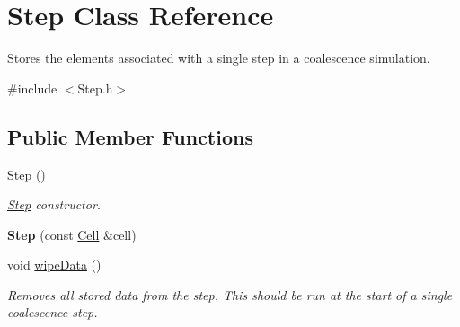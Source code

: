 \hypertarget{struct_step}{}\section{Step Class Reference}
\label{struct_step}


Stores the elements associated with a single step in a coalescence simulation.  




{\ttfamily \#include $<$Step.\+h$>$}

\subsection*{Public Member Functions}
\begin{DoxyCompactItemize}
\item 
\hyperlink{struct_step_a3f66a321aa9c417352a75c85cff5aca5}{Step} ()
\begin{DoxyCompactList}\small\item\em \hyperlink{struct_step}{Step} constructor. \end{DoxyCompactList}\item 
{\bfseries Step} (const \hyperlink{struct_cell}{Cell} \&cell)\hypertarget{struct_step_ae27f73ff1b5ab7b958efcaee14d44d78}{}\label{struct_step_ae27f73ff1b5ab7b958efcaee14d44d78}

\item 
void \hyperlink{struct_step_ac70e891f944dbeba29bfd1d168b9593c}{wipe\+Data} ()\hypertarget{struct_step_ac70e891f944dbeba29bfd1d168b9593c}{}\label{struct_step_ac70e891f944dbeba29bfd1d168b9593c}

\begin{DoxyCompactList}\small\item\em Removes all stored data from the step. This should be run at the start of a single coalescence step. \end{DoxyCompactList}\end{DoxyCompactItemize}
